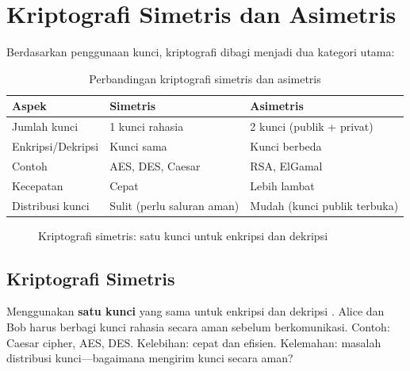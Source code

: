\section{Kriptografi Simetris dan Asimetris}

Berdasarkan penggunaan kunci, kriptografi dibagi menjadi dua kategori utama:

\begin{table}[!htbp]
\centering
\caption{Perbandingan kriptografi simetris dan asimetris}
\label{tab:simetris-asimetris}
\begin{tabular}{@{}lll@{}}
\toprule
\textbf{Aspek} & \textbf{Simetris} & \textbf{Asimetris} \\
\midrule
Jumlah kunci & 1 kunci rahasia & 2 kunci (publik + privat) \\
Enkripsi/Dekripsi & Kunci sama & Kunci berbeda \\
Contoh & AES, DES, Caesar & RSA, ElGamal \\
Kecepatan & Cepat & Lebih lambat \\
Distribusi kunci & Sulit (perlu saluran aman) & Mudah (kunci publik terbuka) \\
\bottomrule
\end{tabular}
\end{table}

\begin{figure}[!htbp]
\centering
{}
\caption{Kriptografi simetris: satu kunci untuk enkripsi dan dekripsi}
\label{fig:simetris}
\end{figure}

\subsection{Kriptografi Simetris}
Menggunakan \textbf{satu kunci} yang sama untuk enkripsi dan dekripsi \cite{katz2020,trappe2006}. Alice dan Bob harus berbagi kunci rahasia secara aman sebelum berkomunikasi. Contoh: Caesar cipher, AES, DES. Kelebihan: cepat dan efisien. Kelemahan: masalah distribusi kunci---bagaimana mengirim kunci secara aman?

